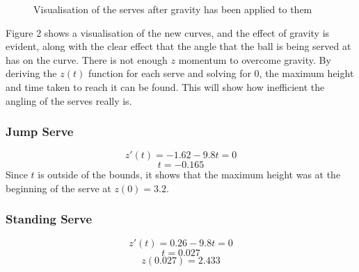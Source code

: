 \documentclass{article}
\begin{document}
\begin{figure}[H]
														\caption{Visualisation of the serves after gravity has been applied to them}
													\end{figure}
													Figure 2 shows a visualisation of the new curves, and the effect of gravity is evident, along with the clear effect that the angle that the ball is being served at has on the curve. There is not enough \(z\) momentum to overcome gravity. By deriving the \(z(t)\) function for each serve and solving for \(0\), the maximum height and time taken to reach it can be found. This will show how inefficient the angling of the serves really is. 

													\subsubsection*{Jump Serve}
													\[z'(t) = -1.62 - 9.8t = 0\]
													\[t = -0.165\]
													Since \(t\) is outside of the bounds, it shows that the maximum height was at the beginning of the serve at \(z(0) = 3.2\).
													\subsubsection*{Standing Serve}
													\[z'(t) = 0.26 - 9.8t = 0\]
													\[t = 0.027\]
													\[z(0.027) = 2.433\]
\end{document}
